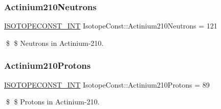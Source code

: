 \subsubsection{\texorpdfstring{Actinium210\+Neutrons}{Actinium210Neutrons}}
{\footnotesize\ttfamily \mbox{\hyperlink{group___isotope_const-_macros_ga5f18360b3e99483a35c32d789e62621c}{I\+S\+O\+T\+O\+P\+E\+C\+O\+N\+S\+T\+\_\+\+I\+NT}} Isotope\+Const\+::\+Actinium210\+Neutrons = 121}

\$ \$ Neutrons in Actinium-\/210. \mbox{\label{group___isotope_const-_actinium-_ac210_ga83ceba4b28404f4d64fb37d51c18ac34}} 
\subsubsection{\texorpdfstring{Actinium210\+Protons}{Actinium210Protons}}
{\footnotesize\ttfamily \mbox{\hyperlink{group___isotope_const-_macros_ga5f18360b3e99483a35c32d789e62621c}{I\+S\+O\+T\+O\+P\+E\+C\+O\+N\+S\+T\+\_\+\+I\+NT}} Isotope\+Const\+::\+Actinium210\+Protons = 89}

\$ \$ Protons in Actinium-\/210. 